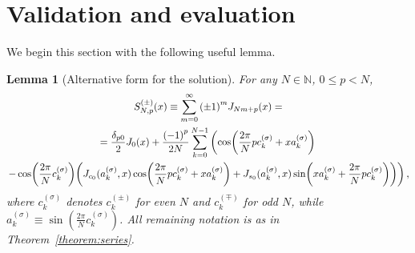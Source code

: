 \documentclass{article}
\newtheorem{lemma}[theorem]{Lemma}
\begin{document}
\endgroup


\section{Validation and evaluation}
\label{sec:numerical_evaluation}

We begin this section with the following useful lemma.
\begin{lemma}[Alternative form for the solution]
\label{lem:series_alt}
For any $N \in \mathbb{N}$, $0 \le p < N$,
\begin{multline}
\label{eq:series_alt}
S^{(\pm)}_{N,p}(x) \equiv \sum_{m=0}^{\infty} \qty(\pm 1)^m J_{Nm+p}(x) = \\
= \frac{\delta_{p0}}{2} J_0(x) + \frac{\qty(-1)^p}{2N} \sum_{k=0}^{N-1} \left(\cos(\frac{2\pi}{N} p c^{(\sigma)}_k + x a^{(\sigma)}_k)  \right.\\
\left.-\cos(\frac{2\pi}{N} c^{(\sigma)}_k) \qty(\JC0(a^{(\sigma)}_k, x) \cos(\frac{2\pi}{N} p c^{(\sigma)}_k + x a^{(\sigma)}_k) + \JS0(a^{(\sigma)}_k, x) \sin(x a^{(\sigma)}_k + \frac{2\pi}{N} p c^{(\sigma)}_k))\right),
\end{multline}
where $c^{(\sigma)}_k$ denotes $c^{(\pm)}_k$ for even $N$ and $c^{(\mp)}_k$ for odd $N$,
while $a^{(\sigma)}_k \equiv \sin(\frac{2\pi}{N}c^{(\sigma)}_k)$.
All remaining notation is as in Theorem~\ref{theorem:series}.
\end{lemma}
\end{document}
